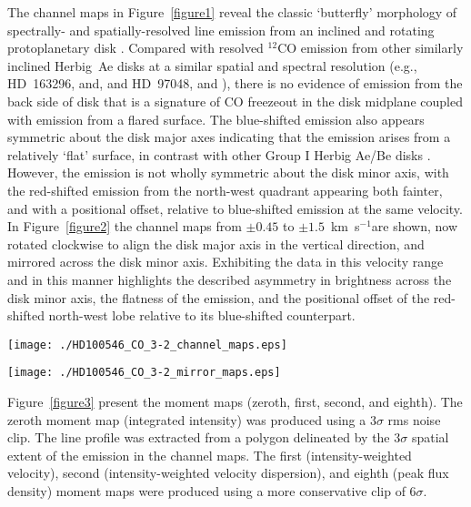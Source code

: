 \documentclass[onecolumn]{aastex6}
\newcommand{\kms}{km~s$^{-1}$}
\begin{document}
The channel maps in Figure~\ref{figure1} reveal the classic `butterfly' morphology of
spectrally- and spatially-resolved line emission from an inclined
and rotating protoplanetary disk \citep[see, e.g.,][]{semenov08}.
Compared with resolved $^{12}$CO emission from other similarly inclined Herbig~Ae disks
at a similar spatial and spectral resolution
(e.g., HD~163296, \citealt{degregorio13} and\citealt{rosenfeld13}, and
HD~97048, \citealt{walsh16} and \citet{vanderplas17}),
there is no evidence of emission from the back side of disk that is a
signature of CO freezeout in the disk midplane coupled with
emission from a flared surface.
The blue-shifted emission also appears symmetric about the disk major axes
indicating that the emission arises from a relatively `flat' surface,
in contrast with other Group I Herbig Ae/Be disks
\citep[e.g., HD~97048,][]{walsh16,vanderplas17}.
However, the emission is not wholly symmetric about the disk minor axis,
with the red-shifted emission from the north-west quadrant appearing both
fainter, and with a positional offset, relative to blue-shifted
emission at the same velocity.
In Figure~\ref{figure2} the channel maps from $\pm 0.45$ to $\pm 1.5$~\kms are
shown, now rotated clockwise to align the disk major axis in the vertical direction, and
mirrored across the disk minor axis.
Exhibiting the data in this velocity range and in this manner highlights
the described asymmetry in brightness across the disk minor axis, the flatness of the emission, and
the positional offset of the red-shifted north-west lobe relative to
its blue-shifted counterpart.

\begin{figure*}[!htb]
\texttt{[image: ./HD100546\_CO\_3-2\_channel\_maps.eps]}
\caption{Channel maps of the CO $\mathrm{J}=3-2$ line emission imaged at a
spectral resolution of 0.15~\kms. The dashed lines
represent the disk major and minor axes determined from analysis of the
continuum \citep{walsh14}.}
\label{figure1}
\end{figure*}

\begin{figure*}[ht]
\texttt{[image: ./HD100546\_CO\_3-2\_mirror\_maps.eps]}
\caption{Channel maps of the CO $\mathrm{J}=3-2$ line emission rotated
to align the disk major axis in the vertical direction, and mirrored across the disk minor axis.}
\label{figure2}
\end{figure*}

Figure~\ref{figure3} present the moment maps
(zeroth, first, second, and eighth).
The zeroth moment map (integrated intensity) was produced using
a $3\sigma$ rms noise clip.
The line profile was extracted from a polygon delineated by the
$3\sigma$ spatial extent of the emission in the channel maps.
The first (intensity-weighted velocity), second (intensity-weighted velocity dispersion),
and eighth (peak flux density) moment maps were produced using a more
conservative clip of $6\sigma$.
\end{document}
